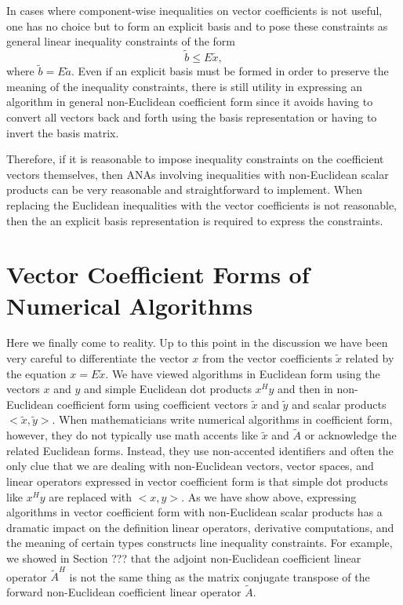 \documentclass[pdf,ps2pdf,11pt]{SANDreport}
\begin{document}
In cases where component-wise inequalities on vector coefficients is not
useful, one has no choice but to form an explicit basis and to pose these
constraints as general linear inequality constraints of the form
%
\[
\tilde{b} \le E \tilde{x},
\]
%
where $\tilde{b} = E\tilde{a}$.  Even if an explicit basis must be formed in
order to preserve the meaning of the inequality constraints, there is still
utility in expressing an algorithm in general non-Euclidean coefficient form
since it avoids having to convert all vectors back and forth using the basis
representation or having to invert the basis matrix.

Therefore, if it is reasonable to impose inequality constraints on the
coefficient vectors themselves, then ANAs involving inequalities with
non-Euclidean scalar products can be very reasonable and straightforward to
implement.  When replacing the Euclidean inequalities with the vector
coefficients is not reasonable, then the an explicit basis representation is
required to express the constraints.

\section{Vector Coefficient Forms of Numerical Algorithms}

Here we finally come to reality.  Up to this point in the discussion we have
been very careful to differentiate the vector $x$ from the vector coefficients
$\tilde{x}$ related by the equation $x = E\tilde{x}$.  We have viewed
algorithms in Euclidean form using the vectors $x$ and $y$ and simple
Euclidean dot products $x^H y$ and then in non-Euclidean coefficient form
using coefficient vectors $\tilde{x}$ and $\tilde{y}$ and scalar products
$<\tilde{x},\tilde{y}>$.  When mathematicians write numerical algorithms in
coefficient form, however, they do not typically use math accents like
$\tilde{x}$ and $\tilde{A}$ or acknowledge the related Euclidean forms.
Instead, they use non-accented identifiers and often the only clue that we
are dealing with non-Euclidean vectors, vector spaces, and linear operators
expressed in vector coefficient form is that simple dot products like $x^H y$
are replaced with $<x,y>$.  As we have show above, expressing algorithms in
vector coefficient form with non-Euclidean scalar products has a dramatic
impact on the definition linear operators, derivative computations, and the
meaning of certain types constructs line inequality constraints.  For example,
we showed in Section ??? that the adjoint non-Euclidean coefficient linear
operator $\tilde{A}^H$ is not the same thing as the matrix conjugate transpose
of the forward non-Euclidean coefficient linear operator $\tilde{A}$.
\end{document}
